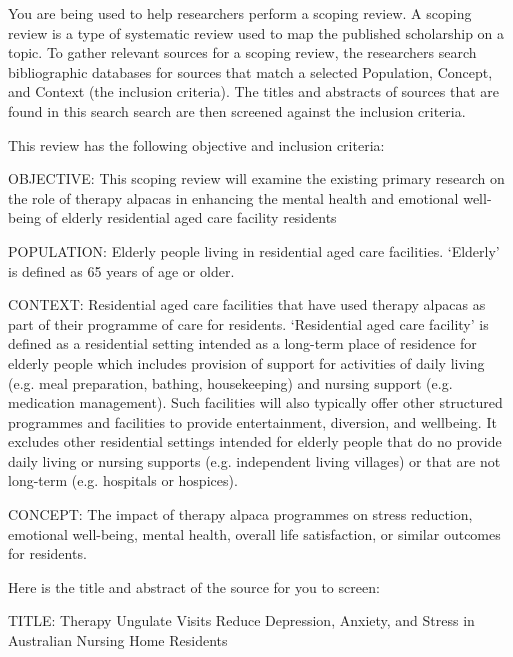 \documentclass{article}
\begin{document}
\pagestyle{empty}
\begin{description}

  \User You are being used to help researchers perform a scoping review. A
  scoping review is a type of systematic review used to map the published
  scholarship on a topic. To gather relevant sources for a scoping review, the
  researchers search bibliographic databases for sources that match a selected
  Population, Concept, and Context (the inclusion criteria). The titles and
  abstracts of sources that are found in this search search are then screened
  against the inclusion criteria.

  This review has the following objective and inclusion criteria:

  OBJECTIVE: This scoping review will examine the existing primary research on
  the role of therapy alpacas in enhancing the mental health and emotional
  well-being of elderly residential aged care facility residents

  POPULATION: Elderly people living in residential aged care facilities.
  `Elderly' is defined as 65 years of age or older.

  CONTEXT: Residential aged care facilities that have used therapy alpacas as
  part of their programme of care for residents. `Residential aged care
  facility' is defined as a residential setting intended as a long-term place
  of residence for elderly people which includes provision of support for
  activities of daily living (e.g. meal preparation, bathing, housekeeping) and
  nursing support (e.g. medication management). Such facilities will also
  typically offer other structured programmes and facilities to provide
  entertainment, diversion, and wellbeing. It excludes other residential
  settings intended for elderly people that do no provide daily living or
  nursing supports (e.g. independent living villages) or that are not long-term
  (e.g. hospitals or hospices).

  CONCEPT: The impact of therapy alpaca programmes on stress reduction,
  emotional well-being, mental health, overall life satisfaction, or similar
  outcomes for residents.

  Here is the title and abstract of the source for you to screen:

  TITLE: Therapy Ungulate Visits Reduce Depression, Anxiety, and Stress in
  Australian Nursing Home Residents


\end{description}
\end{document}
